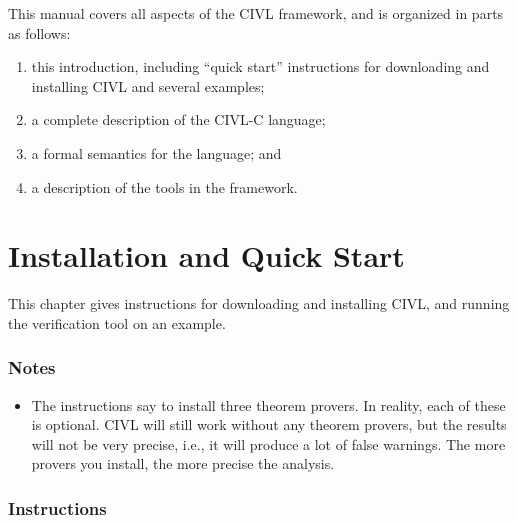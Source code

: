 This manual covers all aspects of the CIVL framework, and is organized in parts
as follows:
\begin{enumerate}
\item this introduction, including ``quick start'' instructions for
  downloading and installing CIVL and several examples;
\item a complete description of the CIVL-C language;
\item a formal semantics for the language; and
\item a description of the tools in the framework.
\end{enumerate}

\chapter{Installation and Quick Start}

This chapter gives instructions for downloading and installing CIVL,
and running the verification tool on an example.

\subsection*{Notes}

\begin{itemize}
\item The instructions say to install three theorem provers.  In
  reality, each of these is optional.  CIVL will still work without
  any theorem provers, but the results will not be very precise, i.e.,
  it will produce a lot of false warnings.  The more provers you
  install, the more precise the analysis.
\end{itemize}

\subsection*{Instructions}

